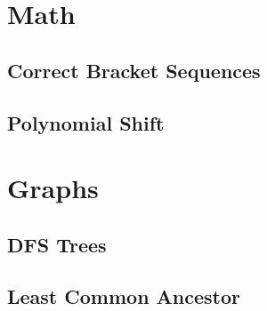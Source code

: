 \documentclass[12pt]{article}
\begin{document}
\section{Math}

\subsection{Correct Bracket Sequences} 
\subsection{Polynomial Shift} 


\section{Graphs}

\subsection{DFS Trees} 
\subsection{Least Common Ancestor} 
\end{document}
